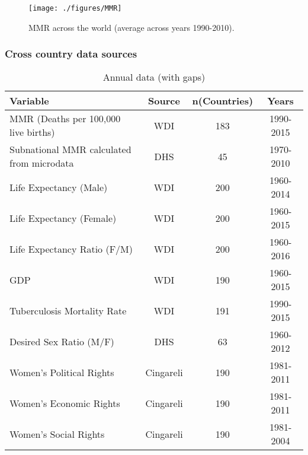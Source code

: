 \documentclass[10pt,letterpaper,subeqn]{beamer}
\begin{document}
\begin{frame}[plain,label=MMRmap]
\begin{figure}[h!]
\centering
\texttt{[image: ./figures/MMR]}
\caption{MMR across the world (average across years 1990-2010).}
\end{figure}
\end{frame}


\begin{frame}
\frametitle{Cross country data sources}

\begin{table}[htbp]\centering
\def\sym#1{\ifmmode^{#1}\else\(^{#1}\)\fi}
\caption{Annual data  (with gaps)}
\scriptsize

						\begin{tabular}{lccc}
\hline
\hline
  Variable &     Source & n(Countries) &      Years \\
\hline
MMR (Deaths per 100,000 live births) &        WDI &        183 & 1990- 2015 \\

Subnational MMR calculated from microdata &        DHS &         45 &  1970-2010 \\

Life Expectancy (Male) &        WDI &        200 &  1960-2014 \\

Life Expectancy (Female) &        WDI &        200 &  1960-2015 \\

Life Expectancy Ratio (F/M) &        WDI &        200 &  1960-2016 \\

       GDP &        WDI &        190 &  1960-2015 \\

Tuberculosis Mortality Rate &        WDI &        191 &  1990-2015 \\

Desired Sex Ratio (M/F) &        DHS &         63 &  1960-2012 \\

Women's Political Rights &  Cingareli &        190 &  1981-2011 \\

Women's Economic Rights &  Cingareli &        190 &  1981-2011 \\

Women's Social Rights &  Cingareli &        190 &  1981-2004 \\
\hline
\end{tabular}  
\end{table}
\end{frame}
\end{document}
